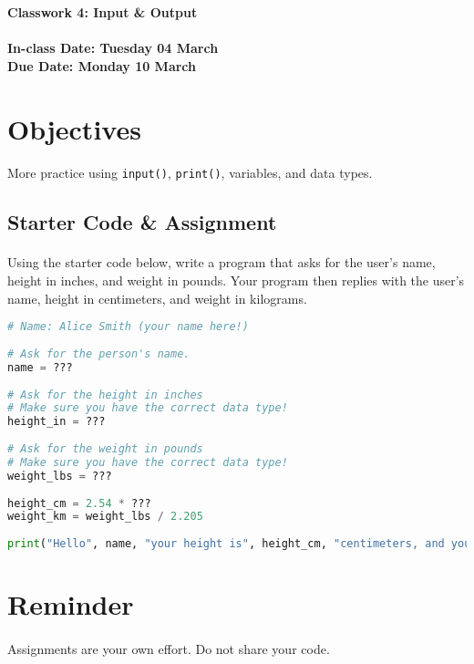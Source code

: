 \documentclass[letter,10pt]{article}
\begin{document}
    
    \huge
    \textbf{Classwork 4: Input \& Output}
    \normalsize
    \\ ~~ \\
    \textbf{In-class Date: Tuesday 04 March} \\
    \textbf{Due Date: Monday 10 March}
    
    \section*{Objectives}
    \paragraph{}More practice using \texttt{input()}, \texttt{print()}, variables, and data types.
    
    \subsection*{Starter Code \& Assignment}
    \paragraph{}Using the starter code below, write a program that asks for the user's name, height in inches, and weight in pounds. Your program then replies with the user's name, height in centimeters, and weight in kilograms.
    
    \begin{lstlisting}[language=python]
# Name: Alice Smith (your name here!)
        
# Ask for the person's name.
name = ???
        
# Ask for the height in inches
# Make sure you have the correct data type!
height_in = ???
        
# Ask for the weight in pounds
# Make sure you have the correct data type!
weight_lbs = ???
        
height_cm = 2.54 * ???
weight_km = weight_lbs / 2.205
        
print("Hello", name, "your height is", height_cm, "centimeters, and you weigh", weight_km, "kilograms.")
    \end{lstlisting}
    
    \section*{Reminder}
    \paragraph{}Assignments are your own effort. Do not share your code.
    
\end{document}
